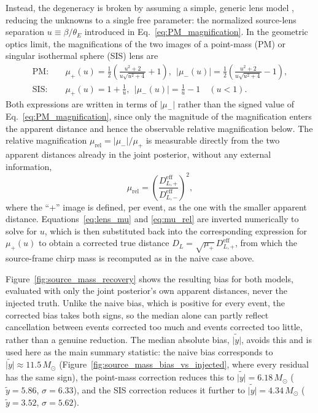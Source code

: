 Instead, the degeneracy is broken by assuming a simple, generic lens model \cite{Kim2024_lensing_distance}, reducing the unknowns to a single free parameter: the normalized source-lens separation $u\equiv\beta/\theta_E$ introduced in Eq.~\eqref{eq:PM_magnification}. In the geometric optics limit, the magnifications of the two images of a point-mass (PM) or singular isothermal sphere (SIS) lens are
\begin{equation}
\begin{split}
\mathrm{PM:}&\quad \mu_+(u) = \frac{1}{2}\left(\frac{u^2+2}{u\sqrt{u^2+4}} + 1\right),\ \ |\mu_-(u)| = \frac{1}{2}\left(\frac{u^2+2}{u\sqrt{u^2+4}} - 1\right), \\
\mathrm{SIS:}&\quad \mu_+(u) = 1+\frac{1}{u},\ \ |\mu_-(u)| = \frac{1}{u}-1 \quad (u<1).
\end{split}
\label{eq:lens_mu}
\end{equation}
Both expressions are written in terms of $|\mu_-|$ rather than the signed value of Eq.~\eqref{eq:PM_magnification}, since only the magnitude of the magnification enters the apparent distance and hence the observable relative magnification below. The relative magnification $\mu_{\mathrm{rel}}=|\mu_-|/\mu_+$ is measurable directly from the two apparent distances already in the joint posterior, without any external information,
\begin{equation}
\mu_{\mathrm{rel}} = \left(\frac{D_{L,+}^{\mathrm{eff}}}{D_{L,-}^{\mathrm{eff}}}\right)^2,
\label{eq:mu_rel}
\end{equation}
where the ``+'' image is defined, per event, as the one with the smaller apparent distance. Equations~\eqref{eq:lens_mu} and \eqref{eq:mu_rel} are inverted numerically to solve for $u$, which is then substituted back into the corresponding expression for $\mu_+(u)$ to obtain a corrected true distance $D_L=\sqrt{\mu_+}\,D_{L,+}^{\mathrm{eff}}$, from which the source-frame chirp mass is recomputed as in the naive case above.

Figure~\ref{fig:source_mass_recovery} shows the resulting bias for both models, evaluated with only the joint posterior's own apparent distances, never the injected truth. Unlike the naive bias, which is positive for every event, the corrected bias takes both signs, so the median alone can partly reflect cancellation between events corrected too much and events corrected too little, rather than a genuine reduction. The median absolute bias, $\widetilde{|y|}$, avoids this and is used here as the main summary statistic: the naive bias corresponds to $\widetilde{|y|}\approx11.5\,M_\odot$ (Figure~\ref{fig:source_mass_bias_vs_injected}, where every residual has the same sign), the point-mass correction reduces this to $\widetilde{|y|}=6.18\,M_\odot$ ($\tilde{y}=5.86$, $\sigma=6.33$), and the SIS correction reduces it further to $\widetilde{|y|}=4.34\,M_\odot$ ($\tilde{y}=3.52$, $\sigma=5.62$).


